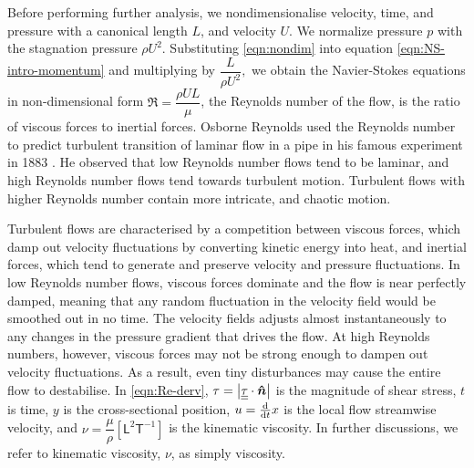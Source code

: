 Before performing further analysis, we nondimensionalise velocity, time, and pressure with a canonical length $L$, and velocity $U$.
We normalize pressure $p$ with the stagnation pressure $\rho U^2$. Substituting \autoref{eqn:nondim} into equation \autoref{eqn:NS-intro-momentum} and multiplying by $\dfrac{L}{\rho U^2},$ we obtain the Navier-Stokes equations in non-dimensional form
$\Re=\dfrac{\rho U L}{\mu}$, the Reynolds number of the flow, is the ratio of viscous forces to inertial forces. Osborne Reynolds used the Reynolds number to predict turbulent transition of laminar flow in a pipe in his famous experiment in 1883 \cite{reynolds}. He observed that low Reynolds number flows tend to be laminar, and high Reynolds number flows tend towards turbulent motion. Turbulent flows with higher Reynolds number contain more intricate, and chaotic motion.

Turbulent flows are characterised by a competition between viscous forces, which damp out velocity fluctuations by converting kinetic energy into heat, and inertial forces, which tend to generate and preserve velocity and pressure fluctuations\cite{wall-bounded-turb}. In low Reynolds number flows, viscous forces dominate and the flow is near perfectly damped, meaning that any random fluctuation in the velocity field would be smoothed out in no time. The velocity fields adjusts almost instantaneously to any changes in the pressure gradient that drives the flow. At high Reynolds numbers, however, viscous forces may not be strong enough to dampen out velocity fluctuations. As a result, even tiny disturbances may cause the entire flow to destabilise. 
In \autoref{eqn:Re-derv}, $\tau=\abs{\underline{\underline{\tau}}\cdot\boldsymbol{\hat{n}}}$ is the magnitude of shear stress, $t$ is time, $y$ is the cross-sectional position, $u=\frac{\mathrm{d}}{\mathrm{d} t}x$ is the local flow streamwise velocity, and $\nu=\dfrac{\mu}{\rho} \left[\textsf{L}^2 \textsf{T}^{-1}\right]$ is the kinematic viscosity. In further discussions, we refer to kinematic viscosity, $\nu$, as simply viscosity.


